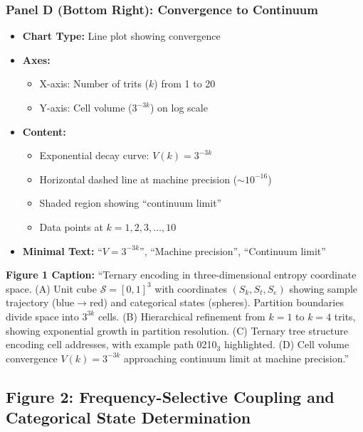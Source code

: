 \subsubsection*{Panel D (Bottom Right): Convergence to Continuum}
\begin{itemize}
\item \textbf{Chart Type:} Line plot showing convergence
\item \textbf{Axes:}
  \begin{itemize}
  \item X-axis: Number of trits ($k$) from 1 to 20
  \item Y-axis: Cell volume ($3^{-3k}$) on log scale
  \end{itemize}
\item \textbf{Content:}
  \begin{itemize}
  \item Exponential decay curve: $V(k) = 3^{-3k}$
  \item Horizontal dashed line at machine precision ($\sim 10^{-16}$)
  \item Shaded region showing ``continuum limit''
  \item Data points at $k = 1,2,3,\ldots,10$
  \end{itemize}
\item \textbf{Minimal Text:} ``$V = 3^{-3k}$'', ``Machine precision'', ``Continuum limit''
\end{itemize}

\textbf{Figure 1 Caption:}
``Ternary encoding in three-dimensional entropy coordinate space. (A) Unit cube $\mathcal{S}=[0,1]^3$ with coordinates $(S_k,S_t,S_e)$ showing sample trajectory (blue$\to$red) and categorical states (spheres). Partition boundaries divide space into $3^{3k}$ cells. (B) Hierarchical refinement from $k=1$ to $k=4$ trits, showing exponential growth in partition resolution. (C) Ternary tree structure encoding cell addresses, with example path 0210$_3$ highlighted. (D) Cell volume convergence $V(k)=3^{-3k}$ approaching continuum limit at machine precision.''


\subsection*{Figure 2: Frequency-Selective Coupling and Categorical State Determination}

